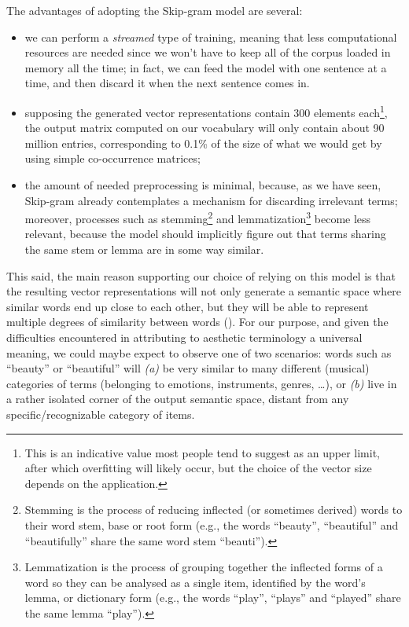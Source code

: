 The advantages of adopting the Skip-gram model are several: 
\begin{itemize}
\item we can perform a \emph{streamed} type of training, meaning that less computational resources are needed since we won't have to keep all of the corpus loaded in memory all the time; in fact, we can feed the model with one sentence at a time, and then discard it when the next sentence comes in.
\item supposing the generated vector representations contain 300 elements each\footnote{This is an indicative value most people tend to suggest as an upper limit, after which overfitting will likely occur, but the choice of the vector size depends on the application.}, the output matrix computed on our vocabulary will only contain about 90 million entries, corresponding to 0.1\% of the size of what we would get by using simple co-occurrence matrices;
\item the amount of needed preprocessing is minimal, because, as we have seen, Skip-gram already contemplates a mechanism for discarding irrelevant terms; moreover, processes such as stemming\footnote{Stemming is the process of reducing inflected (or sometimes derived) words to their word stem, base or root form (e.g., the words ``beauty'', ``beautiful'' and ``beautifully'' share the same word stem ``beauti'').} and lemmatization\footnote{Lemmatization is the process of grouping together the inflected forms of a word so they can be analysed as a single item, identified by the word's lemma, or dictionary form (e.g., the words ``play'', ``plays'' and ``played'' share the same lemma ``play'').} become less relevant, because the model should implicitly figure out that terms sharing the same stem or lemma are in some way similar.
\end{itemize}

This said, the main reason supporting our choice of relying on this model is that the resulting vector representations will not only generate a semantic space where similar words end up close to each other, but they will be able to represent multiple degrees of similarity between words (\cite{mikolov2013linguistic}). For our purpose, and given the difficulties encountered in attributing to aesthetic terminology a universal meaning, we could maybe expect to observe one of two scenarios: words such as ``beauty'' or ``beautiful'' will \emph{(a)} be very similar to many different (musical) categories of terms (belonging to emotions, instruments, genres, \ldots), or \emph{(b)} live in a rather isolated corner of the output semantic space, distant from any specific/recognizable category of items.

